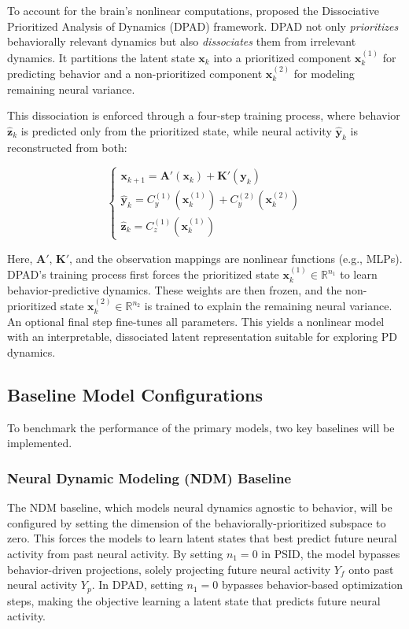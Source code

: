 \documentclass[12pt, letterpaper]{article}
\begin{document}
To account for the brain's nonlinear computations, \textcite{saniDissociativePrioritizedModeling2024} proposed the Dissociative Prioritized Analysis of Dynamics (DPAD) framework. DPAD not only \textit{prioritizes} behaviorally relevant dynamics but also \textit{dissociates} them from irrelevant dynamics. It partitions the latent state $\mathbf{x}_k$ into a prioritized component $\mathbf{x}_k^{(1)}$ for predicting behavior and a non-prioritized component $\mathbf{x}_k^{(2)}$ for modeling remaining neural variance.

This dissociation is enforced through a four-step training process, where behavior $\hat{\mathbf{z}}_k$ is predicted only from the prioritized state, while neural activity $\hat{\mathbf{y}}_k$ is reconstructed from both:

$$
    \begin{cases}
        \mathbf{x}_{k+1} = \mathbf{A}'(\mathbf{x}_k) + \mathbf{K}'(\mathbf{y}_k)           \\
        \hat{\mathbf{y}}_k = C_y^{(1)}(\mathbf{x}_k^{(1)}) + C_y^{(2)}(\mathbf{x}_k^{(2)}) \\
        \hat{\mathbf{z}}_k = C_z^{(1)}(\mathbf{x}_k^{(1)})
    \end{cases}
$$

Here, $\mathbf{A}'$, $\mathbf{K}'$, and the observation mappings are nonlinear functions (e.g., MLPs). DPAD's training process first forces the prioritized state $\mathbf{x}_k^{(1)} \in \mathbb{R}^{n_1}$ to learn behavior-predictive dynamics. These weights are then frozen, and the non-prioritized state $\mathbf{x}_k^{(2)} \in \mathbb{R}^{n_2}$ is trained to explain the remaining neural variance. An optional final step fine-tunes all parameters. This yields a nonlinear model with an interpretable, dissociated latent representation suitable for exploring PD dynamics.


\subsection{Baseline Model Configurations}
To benchmark the performance of the primary models, two key baselines will be implemented.

\subsubsection{Neural Dynamic Modeling (NDM) Baseline}

The NDM baseline, which models neural dynamics agnostic to behavior, will be configured by setting the dimension of the behaviorally-prioritized subspace to zero. This forces the models to learn latent states that best predict future neural activity from past neural activity. By setting $n_1 = 0$ in PSID, the model bypasses behavior-driven projections, solely projecting future neural activity $Y_f$ onto past neural activity $Y_p$. In DPAD, setting $n_1 = 0$ bypasses behavior-based optimization steps, making the objective learning a latent state that predicts future neural activity.
\end{document}
